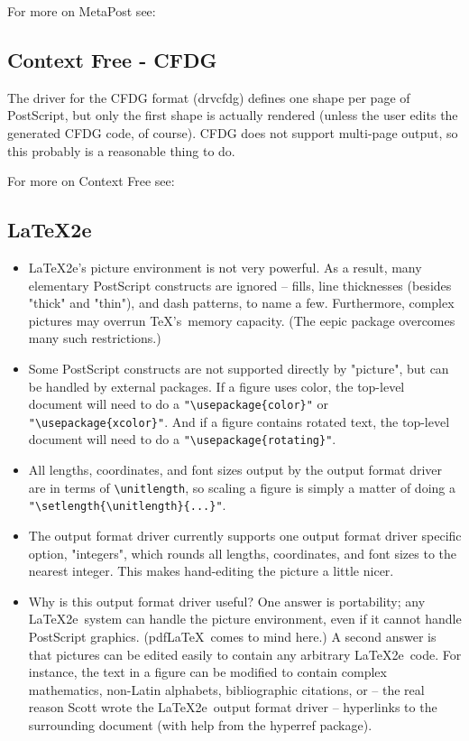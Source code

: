\documentclass[english,a4paper]{article}
\begin{document}
    For more on MetaPost see:


  \subsection{Context Free - CFDG}
    The driver for the CFDG format (drvcfdg) defines
    one shape per page of PostScript, but only the first shape is actually
    rendered (unless the user edits the generated CFDG code, of course).
    CFDG does not support multi-page output, so this probably is a reasonable thing to do.

    For more on Context Free see: 

  \subsection{\LaTeX2e}
    \begin{itemize}
   \item \LaTeX2e's picture environment is not very powerful. As a result, many
     elementary PostScript constructs are ignored -- fills, line
     thicknesses (besides "thick" and "thin"), and dash patterns, to name a
     few. Furthermore, complex pictures may overrun \TeX's\  memory capacity.
     (The eepic package overcomes many such restrictions.)

   \item Some PostScript constructs are not supported directly by "picture",
     but can be handled by external packages. If a figure uses color, the
     top-level document will need to do a \verb+"\usepackage{color}"+ or \verb+"\usepackage{xcolor}"+. And if a
     figure contains rotated text, the top-level document will need to do a
     \verb+"\usepackage{rotating}"+.

   \item All lengths, coordinates, and font sizes output by the output format driver are in
     terms of \verb+\unitlength+, so scaling a figure is simply a matter of doing
     a \verb+"\setlength{\unitlength}{...}"+.

   \item The output format driver currently supports one output format driver specific option,
     "integers", which rounds all lengths, coordinates, and font sizes to
     the nearest integer. This makes hand-editing the picture a little
     nicer.

   \item Why is this output format driver useful? 
     One answer is portability; any \LaTeX2e\ system can handle the picture environment, 
     even if it cannot handle
     PostScript graphics. (pdf\LaTeX\ comes to mind here.) A second answer
     is that pictures can be edited easily to contain any arbitrary 
     \LaTeX2e\  code. For instance, the text in a figure can be modified to contain
     complex mathematics, non-Latin alphabets, bibliographic citations, or
     -- the real reason Scott wrote the \LaTeX2e\ output format driver -- hyperlinks to the
     surrounding document (with help from the hyperref package).
   \end{itemize}
\end{document}
